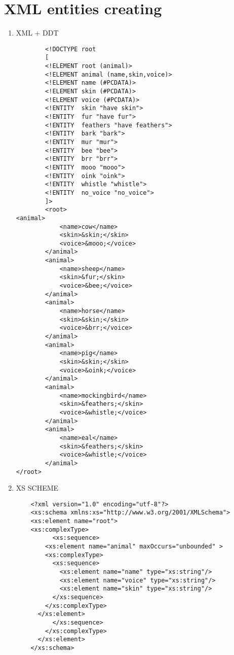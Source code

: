 \documentclass[10pt]{article}
\begin{document}
  \section{XML entities creating    \newline}
  \begin{enumerate}
    \item XML + DDT
    \begin{verbatim}
        <!DOCTYPE root
        [
        <!ELEMENT root (animal)>
        <!ELEMENT animal (name,skin,voice)>
        <!ELEMENT name (#PCDATA)>
        <!ELEMENT skin (#PCDATA)>
        <!ELEMENT voice (#PCDATA)>
        <!ENTITY  skin "have skin">
        <!ENTITY  fur "have fur">
        <!ENTITY  feathers "have feathers">
        <!ENTITY  bark "bark">
        <!ENTITY  mur "mur">
        <!ENTITY  bee "bee">
        <!ENTITY  brr "brr">
        <!ENTITY  mooo "mooo">
        <!ENTITY  oink "oink">
        <!ENTITY  whistle "whistle">
        <!ENTITY  no_voice "no_voice">
        ]>
        <root>
<animal>
            <name>cow</name>
            <skin>&skin;</skin>
            <voice>&mooo;</voice>
        </animal>
        <animal>
            <name>sheep</name>
            <skin>&fur;</skin>
            <voice>&bee;</voice>
        </animal>
        <animal>
            <name>horse</name>
            <skin>&skin;</skin>
            <voice>&brr;</voice>
        </animal>
        <animal>
            <name>pig</name>
            <skin>&skin;</skin>
            <voice>&oink;</voice>
        </animal>
        <animal>
            <name>mockingbird</name>
            <skin>&feathers;</skin>
            <voice>&whistle;</voice>
        </animal>
        <animal>
            <name>eal</name>
            <skin>&feathers;</skin>
            <voice>&whistle;</voice>
        </animal>
</root>
    \end{verbatim}
    \item XS SCHEME
    \begin{verbatim}
    <?xml version="1.0" encoding="utf-8"?>
    <xs:schema xmlns:xs="http://www.w3.org/2001/XMLSchema">
    <xs:element name="root">
	<xs:complexType>
          <xs:sequence>
      	<xs:element name="animal" maxOccurs="unbounded" >
        <xs:complexType>
          <xs:sequence>
            <xs:element name="name" type="xs:string"/>
            <xs:element name="voice" type="xs:string"/>
            <xs:element name="skin" type="xs:string"/>
          </xs:sequence>
        </xs:complexType>
      </xs:element>
          </xs:sequence>
        </xs:complexType>
      </xs:element>
    </xs:schema>
    \end{verbatim}
  \end{enumerate}
\end{document}
